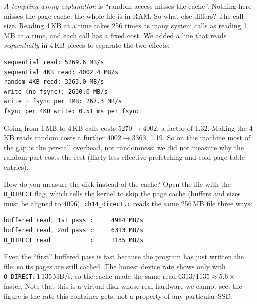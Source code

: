 \begin{example}
\emph{A tempting wrong explanation} is ``random access misses the
cache''. Nothing here misses the page cache: the whole file is in RAM.
So what else differs? The call size. Reading 4\,KB at a time takes 256
times as many system calls as reading 1\,MB at a time, and each call
has a fixed cost. We added a line that reads \emph{sequentially} in
4\,KB pieces to separate the two effects:

\begin{lstlisting}[basicstyle=\ttfamily\scriptsize,caption={Real output of
\texttt{ch14\_fs\_io} (Linux container, file in the page cache).}]
sequential read: 5269.6 MB/s
sequential 4KB read: 4002.4 MB/s
random 4KB read: 3363.0 MB/s
write (no fsync): 2630.0 MB/s
write + fsync per 1MB: 267.3 MB/s
fsync per 4KB write: 0.51 ms per fsync
\end{lstlisting}
Going from 1\,MB to 4\,KB calls costs $5270\to4002$, a factor of
1.32. Making the 4\,KB reads random costs a further $4002\to3363$,
1.19. So on this machine most of the gap is the per-call overhead,
not randomness; we did not measure why the random part costs the rest
(likely less effective prefetching and cold page-table entries).
\end{example}



\begin{example}
How do you measure the disk instead of the cache? Open the file with
the \texttt{O\_DIRECT} flag, which tells the kernel to skip the page
cache (buffers and sizes must be aligned to 4096). \texttt{ch14\_direct.c}
reads the same 256\,MB file three ways:

\begin{lstlisting}[basicstyle=\ttfamily\scriptsize,caption={Real output of
\texttt{ch14\_direct} (Linux container, ext4 on a virtual disk).}]
buffered read, 1st pass :     4984 MB/s
buffered read, 2nd pass :     6313 MB/s
O_DIRECT read           :     1135 MB/s
\end{lstlisting}
Even the ``first'' buffered pass is fast because the program has just
written the file, so its pages are still cached. The honest device
rate shows only with \texttt{O\_DIRECT}: 1\,135\,MB/s, so the cache
made the same read $6313/1135\approx5.6\times$ faster. Note that this
is a virtual disk whose real hardware we cannot see; the figure is the
rate this container gets, not a property of any particular SSD.
\end{example}

